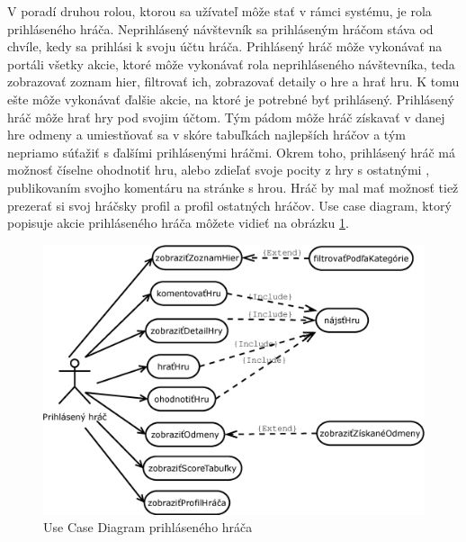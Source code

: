V poradí druhou rolou, ktorou sa užívateľ môže stať v rámci systému, je rola prihláseného hráča. Neprihlásený návštevník sa prihláseným hráčom stáva od chvíle, kedy sa prihlási k svoju účtu hráča.  Prihlásený hráč môže vykonávať na portáli všetky akcie, ktoré môže vykonávať rola neprihláseného návštevníka, teda zobrazovať zoznam hier, filtrovať ich, zobrazovať detaily o hre a hrať hru. K tomu ešte môže vykonávať ďalšie akcie, na ktoré je potrebné byť prihlásený. Prihlásený hráč môže hrať hry pod svojim účtom. Tým pádom môže hráč získavať v danej hre odmeny a umiestňovať sa v skóre tabuľkách najlepších hráčov a tým nepriamo súťažiť s ďalšími prihlásenými hráčmi. Okrem toho, prihlásený hráč má možnosť číselne ohodnotiť hru, alebo zdieľať svoje pocity z hry s ostatnými , publikovaním svojho komentáru na stránke s hrou. Hráč by mal mať možnosť tiež prezerať si svoj hráčsky profil a profil ostatných hráčov. Use case diagram, ktorý popisuje akcie prihláseného hráča môžete vidieť na obrázku \ref{fig:ucdprihlasenyhrac}.
\pagebreak
\begin{figure}[h]
  \centering
  \includegraphics[scale=0.43]{fig/ucd-prihlasenyhrac.eps}
  \caption{Use Case Diagram prihláseného hráča}
  \label{fig:ucdprihlasenyhrac}
\end{figure}

